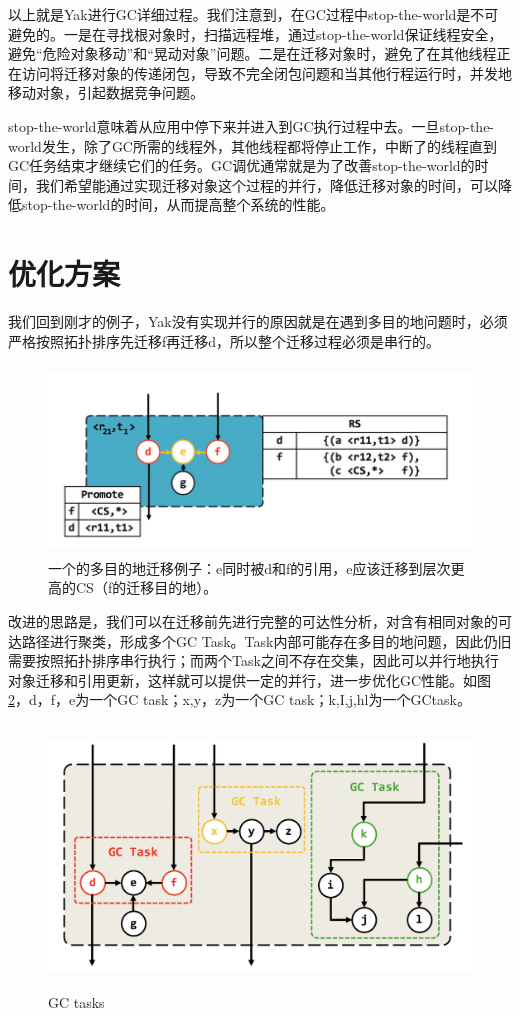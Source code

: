 以上就是Yak进行GC详细过程。我们注意到，在GC过程中stop-the-world是不可避免的。一是在寻找根对象时，扫描远程堆，通过stop-the-world保证线程安全，避免“危险对象移动”和“晃动对象”问题。二是在迁移对象时，避免了在其他线程正在访问将迁移对象的传递闭包，导致不完全闭包问题和当其他行程运行时，并发地移动对象，引起数据竞争问题。

stop-the-world意味着从应用中停下来并进入到GC执行过程中去。一旦stop-the-world发生，除了GC所需的线程外，其他线程都将停止工作，中断了的线程直到GC任务结束才继续它们的任务。GC调优通常就是为了改善stop-the-world的时间，我们希望能通过实现迁移对象这个过程的并行，降低迁移对象的时间，可以降低stop-the-world的时间，从而提高整个系统的性能。


\section{优化方案}

我们回到刚才的例子，Yak没有实现并行的原因就是在遇到多目的地问题时，必须严格按照拓扑排序先迁移f再迁移d，所以整个迁移过程必须是串行的。
\begin{figure}[H]
    \centering
    \includegraphics[width=12cm,height=5cm]{figure/n1.png}
    \caption{
        一个的多目的地迁移例子：e同时被d和f的引用，e应该迁移到层次更高的CS（f的迁移目的地）。
    }
    \label{snapshot}
\end{figure}
改进的思路是，我们可以在迁移前先进行完整的可达性分析，对含有相同对象的可达路径进行聚类，形成多个GC Task。Task内部可能存在多目的地问题，因此仍旧需要按照拓扑排序串行执行；而两个Task之间不存在交集，因此可以并行地执行对象迁移和引用更新，这样就可以提供一定的并行，进一步优化GC性能。如图\ref{snapshot}，d，f，e为一个GC task；x,y，z为一个GC task；k,I,j,hl为一个GCtask。

\begin{figure}[H]
    \centering
    \includegraphics[width=12cm,height=7cm]{figure/n2.jpeg}
    \caption{
        GC tasks
    }
    \label{snapshot}
\end{figure}



